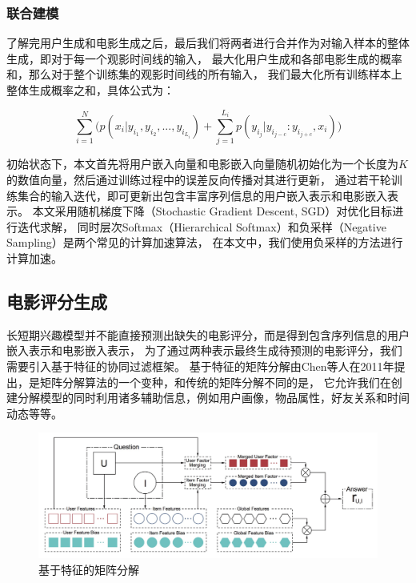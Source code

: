\subsubsection{联合建模}
了解完用户生成和电影生成之后，最后我们将两者进行合并作为对输入样本的整体生成，即对于每一个观影时间线的输入，
最大化用户生成和各部电影生成的概率和，那么对于整个训练集的观影时间线的所有输入，
我们最大化所有训练样本上整体生成概率之和，具体公式为：

\begin{equation}
\sum_{i=1}^{N} \bigg( p(x_i | y_{i_1}, y_{i_2}, ..., y_{i_{L_i}}) +
\sum_{j=1}^{L_i} p(y_{i_j} | y_{i_{j-c}} : y_{i_{j+c}}, x_i) \bigg)
\end{equation}

初始状态下，本文首先将用户嵌入向量和电影嵌入向量随机初始化为一个长度为$K$的数值向量，然后通过训练过程中的误差反向传播对其进行更新，
通过若干轮训练集合的输入迭代，即可更新出包含丰富序列信息的用户嵌入表示和电影嵌入表示。
本文采用随机梯度下降（Stochastic Gradient Descent, SGD）对优化目标进行迭代求解，
同时层次Softmax（Hierarchical Softmax）和负采样（Negative Sampling）是两个常见的计算加速算法，
在本文中，我们使用负采样的方法进行计算加速。

\subsection{电影评分生成}
长短期兴趣模型并不能直接预测出缺失的电影评分，而是得到包含序列信息的用户嵌入表示和电影嵌入表示，
为了通过两种表示最终生成待预测的电影评分，我们需要引入基于特征的协同过滤框架。
基于特征的矩阵分解由Chen等人\parencite{chen2011feature}在2011年提出，是矩阵分解算法的一个变种，和传统的矩阵分解不同的是，
它允许我们在创建分解模型的同时利用诸多辅助信息，例如用户画像，物品属性，好友关系和时间动态等等。

\begin{figure}[htbp]
    \centering
    \includegraphics[scale=0.22]{images/svdfeature.jpeg}
    \caption{基于特征的矩阵分解}
    \label{fig:svdfeature}
\end{figure}

